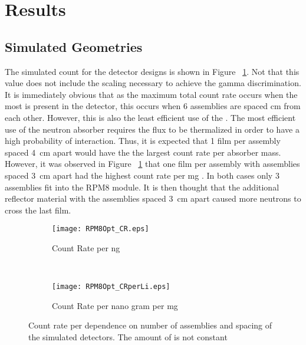 \section{Results}
\label{sec:Results}

\subsection{Simulated Geometries}

The simulated count for the detector designs is shown in Figure ~\ref{fig:SimCountRate}.
Not that this value does not include the scaling necessary to achieve the gamma discrimination. 
It is immediately obvious that as the maximum total count rate occurs when the most  is present in the detector, this occurs when 6 assemblies are spaced \si{\centi\meter} from each other.
However, this is also the least efficient use of the .
The most efficient use of the neutron absorber requires the flux to be thermalized in order to have a high probability of interaction.
Thus, it is expected that 1 film per assembly spaced \SI{4}{\centi\meter} apart would have the the largest count rate per absorber mass.
However, it was observed in Figure ~\ref{fig:SimCountRate} that one film per assembly with assemblies spaced \SI{3}{\centi\meter} apart had the highest count rate per \si{\milli\gram} .
In both cases only 3 assemblies fit into the RPM8 module.
It is then thought that the additional reflector material with the assemblies spaced \SI{3}{\centi\meter} apart caused more neutrons to cross the last film.
\begin{figure}
    \centering
    \begin{subfigure}[b]{0.45\textwidth}
        \texttt{[image: RPM8Opt\_CR.eps]}
        \caption{Count Rate per \si{\nano\gram{}}}
    \end{subfigure}%
    ~
    \begin{subfigure}[b]{0.45\textwidth}
        \texttt{[image: RPM8Opt\_CRperLi.eps]}
        \caption{Count Rate per nano gram  per \si{\milli\gram} }
    \end{subfigure}
    \caption{Count rate per dependence on number of assemblies and spacing of the simulated detectors. The amount of  is not constant}
    \label{fig:SimCountRate}
\end{figure}

